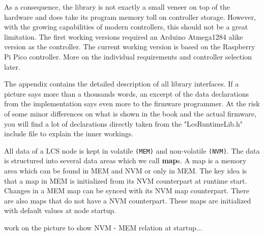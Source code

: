 As a consequence, the library is not exactly a small veneer on top of the hardware and does take its program memory toll on controller storage. However, with the growing capabilities of modern controllers, this should not be a great limitation. The first working versions required an Arduino Atmega1284 alike version as the controller. The current working version is based on the Raspberry Pi Pico controller. More on the individual requirements and controller selection later.

The appendix contains the detailed description of all library interfaces. If a picture says more than a thousands words, an excerpt of the data declarations from the implementation says even more to the firmware programmer. At the risk of some minor differences on what is shown in the book and the actual firmware, you will find a lot of declarations directly taken from the "LcsRuntimeLib.h" include file to explain the inner workings.


All data of a LCS node is kept in volatile \texttt{(MEM)} and non-volatile \texttt{(NVM)}. The data is structured into several data areas which we call \textbf{map}s. A map is a memory area which can be found in MEM and NVM or only in MEM. The key idea is that a map in MEM is initialized from its NVM counterpart at runtime start. Changes in a MEM map can be synced with its NVM map counterpart. There are also maps that do not have a NVM counterpart. These maps are initialized with default values at node startup. 

work on the picture to show NVM - MEM relation at startup...


